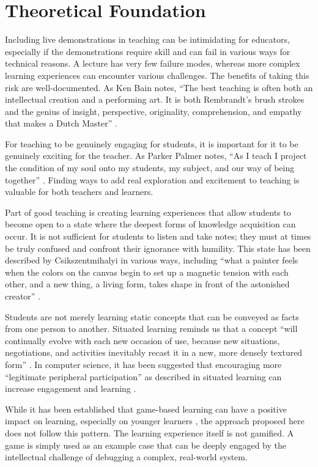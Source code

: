 \documentclass[letterpaper]{article}
\begin{document}
\section{Theoretical Foundation}
Including live demonstrations in teaching can be intimidating for educators, especially if the demonstrations require skill and can fail in various ways for technical reasons. A lecture has very few failure modes, whereas more complex learning experiences can encounter various challenges. The benefits of taking this risk are well-documented. As Ken Bain notes, ``The best teaching is often both an intellectual creation and a performing art. It is both Rembrandt’s brush strokes and the genius of insight, perspective, originality, comprehension, and empathy that makes a Dutch Master'' \cite{bain2004best}.

For teaching to be genuinely engaging for students, it is important for it to be genuinely exciting for the teacher. As Parker Palmer notes, ``As I teach I project the condition of my soul onto my students, my subject, and our way of being together'' \cite{palmer2000courage}. Finding ways to add real exploration and excitement to teaching is valuable for both teachers and learners.

Part of good teaching is creating learning experiences that allow students to become open to a state where the deepest forms of knowledge acquisition can occur. It is not sufficient for students to listen and take notes; they must at times be truly confused and confront their ignorance with humility. This state has been described by Csikszentmihalyi in various ways, including ``what a painter feels when the colors on the canvas begin to set up a magnetic tension with each other, and a new thing, a living form, takes shape in front of the astonished creator'' \cite{csikszentmihalyi1990flow}.

Students are not merely learning static concepts that can be conveyed as facts from one person to another. Situated learning reminds us that a concept ``will continually evolve with each new occasion of use, because new situations, negotiations, and activities inevitably recast it in a new, more densely textured form'' \cite{brown1989situated}. In computer science, it has been suggested that encouraging more ``legitimate peripheral participation'' as described in situated learning can increase engagement and learning \cite{ben2004situated} \cite{guzdial2006imagineering}.

While it has been established that game-based learning can have a positive impact on learning, especially on younger learners \cite{arztmann2023effects}, the approach proposed here does not follow this pattern. The learning experience itself is not gamified. A game is simply used as an example case that can be deeply engaged by the intellectual challenge of debugging a complex, real-world system.
\end{document}
